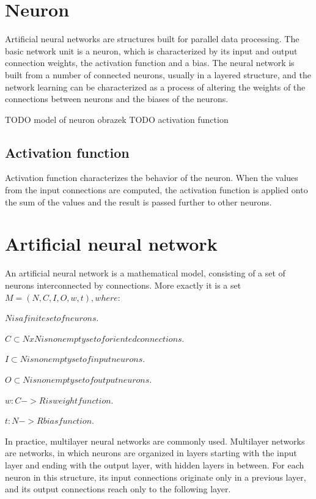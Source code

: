 \begin{description}
\section{Neuron}
Artificial neural networks are structures built for parallel data processing. The basic network unit is a neuron, which is characterized by its input and output connection weights, the activation function and a bias. The neural network is built from a number of connected neurons, usually in a layered structure, and the network learning can be characterized as a process of altering the weights of the connections between neurons and the biases of the neurons.

TODO model of neuron obrazek
TODO activation function
\subsection{Activation function}
Activation function characterizes the behavior of the neuron. When the values from the input connections are computed, the activation function is applied onto the sum of the values and the result is passed further to other neurons.

\section{Artificial neural network}
An artificial neural network is a mathematical model, consisting of a set of neurons interconnected by connections.
More exactly it is a set 
$M  =  (N,C,I,O,w,t),  where: $
\begin{description}
\item $N  is  a  finite  set  of  neurons.$
\item $C \subset N x N  is  nonempty  set  of  oriented  connections.$
\item $I \subset N  is  nonempty  set  of  input  neurons.$
\item $O \subset N  is  nonempty  set  of  output  neurons.$
\item $w : C -> R  is  weight  function.$
\item $t : N->R  bias  function.$
\end{description}

In practice, multilayer neural networks are commonly used. Multilayer networks are networks, in which neurons are organized in layers starting with the input layer and ending with the output layer, with hidden layers in between. For each neuron in this structure, its input connections originate only in a previous layer, and its output connections reach only to the following layer. 


\end{description}
